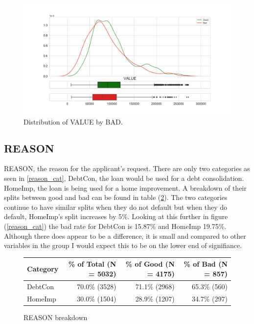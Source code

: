 \begin{figure}[!ht]
	\centering
	\includegraphics[scale=0.40]{figs/value_dist.pdf}
	\caption{Distribution of VALUE by BAD. \label{value_dist}}
\end{figure}

\subsection*{REASON}

REASON,  the reason for the applicant's request. There are only two categories as seen in \ref{reason_cat},  DebtCon,  the loan would be used for a debt consolidation. HomeImp,  the loan is being used for a home improvement. A breakdown of their splits between good and bad can be found in table (\ref{reason_count_tbl}). The two categories continue to have similar splits when they do not default but when they do default,  HomeImp's split increases by 5\%. Looking at this further in figure (\ref{reason_cat}) the bad rate for DebtCon is 15.87\% and HomeImp 19.75\%. Although there does appear to be a difference,  it is small and compared to other variables in the group I would expect this to be on the lower end of signifiance.

\begin{figure}[ht]
	\centering
	\renewcommand{\arraystretch}{2}
	\begin{tabular}{lrrr}
		\toprule
		Category & \% of Total (N = 5032) & \% of Good (N = 4175) & \% of Bad (N = 857) \\
		\midrule
		DebtCon &  70.0\% (3528) & 71.1\% (2968) & 65.3\% (560)  \\
		HomeImp & 30.0\% (1504) & 28.9\% (1207) &  34.7\% (297)  \\
		\bottomrule
	\end{tabular}
	\caption{REASON breakdown \label{reason_count_tbl}}
\end{figure}

